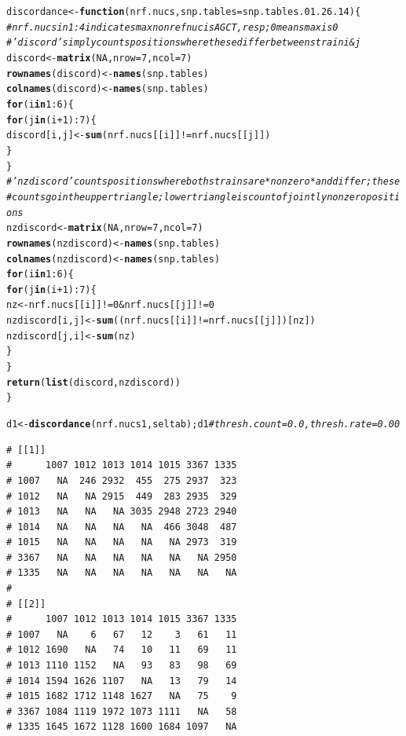 \documentclass{article}\usepackage[]{graphicx}\usepackage[]{color}
\makeatletter
\newcommand{\hlnum}[1]{\textcolor[rgb]{0.686,0.059,0.569}{#1}}%
\newcommand{\hlcom}[1]{\textcolor[rgb]{0.678,0.584,0.686}{\textit{#1}}}%
\newcommand{\hlopt}[1]{\textcolor[rgb]{0,0,0}{#1}}%
\newcommand{\hlstd}[1]{\textcolor[rgb]{0.345,0.345,0.345}{#1}}%
\newcommand{\hlkwa}[1]{\textcolor[rgb]{0.161,0.373,0.58}{\textbf{#1}}}%
\newcommand{\hlkwb}[1]{\textcolor[rgb]{0.69,0.353,0.396}{#1}}%
\newcommand{\hlkwc}[1]{\textcolor[rgb]{0.333,0.667,0.333}{#1}}%
\newcommand{\hlkwd}[1]{\textcolor[rgb]{0.737,0.353,0.396}{\textbf{#1}}}%
\newenvironment{kframe}{%
 \def\at@end@of@kframe{}%
 \ifinner\ifhmode%
  \def\at@end@of@kframe{\end{minipage}}%
  \begin{minipage}{\columnwidth}%
 \fi\fi%
 \def\FrameCommand##1{\hskip\@totalleftmargin \hskip-\fboxsep
 \colorbox{shadecolor}{##1}\hskip-\fboxsep
     \hskip-\linewidth \hskip-\@totalleftmargin \hskip\columnwidth}%
 \MakeFramed {\advance\hsize-\width
   \@totalleftmargin\z@ \linewidth\hsize
   \@setminipage}}%
 {\par\unskip\endMakeFramed%
 \at@end@of@kframe}
\newenvironment{knitrout}{}{} %
\makeatother
\begin{document}
\begin{knitrout}
\begin{kframe}
\begin{alltt}
\hlstd{discordance} \hlkwb{<-} \hlkwa{function}\hlstd{(}\hlkwc{nrf.nucs}\hlstd{,} \hlkwc{snp.tables}\hlstd{=snp.tables.01.26.14)\{}
  \hlcom{# nrf.nucs in 1:4 indicates max nonref nuc is AGCT, resp; 0 means max is 0}
  \hlcom{# 'discord' simply counts positions where these differ between strain i & j}
  \hlstd{discord} \hlkwb{<-} \hlkwd{matrix}\hlstd{(}\hlnum{NA}\hlstd{,}\hlkwc{nrow}\hlstd{=}\hlnum{7}\hlstd{,}\hlkwc{ncol}\hlstd{=}\hlnum{7}\hlstd{)}
  \hlkwd{rownames}\hlstd{(discord)} \hlkwb{<-} \hlkwd{names}\hlstd{(snp.tables)}
  \hlkwd{colnames}\hlstd{(discord)} \hlkwb{<-} \hlkwd{names}\hlstd{(snp.tables)}
  \hlkwa{for}\hlstd{(i} \hlkwa{in} \hlnum{1}\hlopt{:}\hlnum{6}\hlstd{)\{}
    \hlkwa{for}\hlstd{(j} \hlkwa{in} \hlstd{(i}\hlopt{+}\hlnum{1}\hlstd{)}\hlopt{:}\hlnum{7}\hlstd{)\{}
      \hlstd{discord[i,j]} \hlkwb{<-} \hlkwd{sum}\hlstd{(nrf.nucs[[i]]} \hlopt{!=} \hlstd{nrf.nucs[[j]])}
    \hlstd{\}}
  \hlstd{\}}
  \hlcom{# 'nzdiscord' counts positions where both strains are *nonzero* and differ; these}
  \hlcom{# counts go in the upper triangle; lower triangle is count of jointly nonzero positions}
  \hlstd{nzdiscord} \hlkwb{<-} \hlkwd{matrix}\hlstd{(}\hlnum{NA}\hlstd{,}\hlkwc{nrow}\hlstd{=}\hlnum{7}\hlstd{,}\hlkwc{ncol}\hlstd{=}\hlnum{7}\hlstd{)}
  \hlkwd{rownames}\hlstd{(nzdiscord)} \hlkwb{<-} \hlkwd{names}\hlstd{(snp.tables)}
  \hlkwd{colnames}\hlstd{(nzdiscord)} \hlkwb{<-} \hlkwd{names}\hlstd{(snp.tables)}
  \hlkwa{for}\hlstd{(i} \hlkwa{in} \hlnum{1}\hlopt{:}\hlnum{6}\hlstd{)\{}
    \hlkwa{for}\hlstd{(j} \hlkwa{in} \hlstd{(i}\hlopt{+}\hlnum{1}\hlstd{)}\hlopt{:}\hlnum{7}\hlstd{)\{}
      \hlstd{nz} \hlkwb{<-} \hlstd{nrf.nucs[[i]]} \hlopt{!=} \hlnum{0}  \hlopt{&} \hlstd{nrf.nucs[[j]]} \hlopt{!=} \hlnum{0}
      \hlstd{nzdiscord[i,j]} \hlkwb{<-} \hlkwd{sum}\hlstd{((nrf.nucs[[i]]} \hlopt{!=} \hlstd{nrf.nucs[[j]])[nz])}
      \hlstd{nzdiscord[j,i]} \hlkwb{<-} \hlkwd{sum}\hlstd{(nz)}
    \hlstd{\}}
  \hlstd{\}}
  \hlkwd{return}\hlstd{(}\hlkwd{list}\hlstd{(discord,nzdiscord))}
\hlstd{\}}

\hlstd{d1} \hlkwb{<-} \hlkwd{discordance}\hlstd{(nrf.nucs1, seltab); d1} \hlcom{# thresh.count=0.0, thresh.rate=0.00}
\end{alltt}
\begin{verbatim}
# [[1]]
#      1007 1012 1013 1014 1015 3367 1335
# 1007   NA  246 2932  455  275 2937  323
# 1012   NA   NA 2915  449  283 2935  329
# 1013   NA   NA   NA 3035 2948 2723 2940
# 1014   NA   NA   NA   NA  466 3048  487
# 1015   NA   NA   NA   NA   NA 2973  319
# 3367   NA   NA   NA   NA   NA   NA 2950
# 1335   NA   NA   NA   NA   NA   NA   NA
# 
# [[2]]
#      1007 1012 1013 1014 1015 3367 1335
# 1007   NA    6   67   12    3   61   11
# 1012 1690   NA   74   10   11   69   11
# 1013 1110 1152   NA   93   83   98   69
# 1014 1594 1626 1107   NA   13   79   14
# 1015 1682 1712 1148 1627   NA   75    9
# 3367 1084 1119 1972 1073 1111   NA   58
# 1335 1645 1672 1128 1600 1684 1097   NA
\end{verbatim}
\end{kframe}
\end{knitrout}
\end{document}
